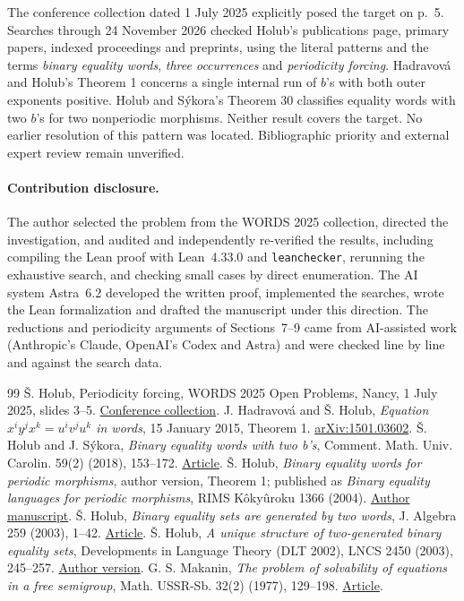 \documentclass[11pt]{article}
\theoremstyle{remark}\newtheorem*{remark}{Remark}
\begin{document}
The conference collection dated 1 July 2025 explicitly posed the target on p.~5. Searches through 24 November 2026 checked Holub's publications page, primary papers, indexed proceedings and preprints, using the literal patterns and the terms \emph{binary equality words}, \emph{three occurrences} and \emph{periodicity forcing}. Hadravov\'a and Holub's Theorem 1 concerns a single internal run of \(b\)'s with both outer exponents positive. Holub and S\'ykora's Theorem 30 classifies equality words with two \(b\)'s for two nonperiodic morphisms. Neither result covers the target. No earlier resolution of this pattern was located. Bibliographic priority and external expert review remain unverified.

\paragraph{Contribution disclosure.}
The author selected the problem from the WORDS 2025 collection, directed the investigation, and audited and independently re-verified the results, including compiling the Lean proof with Lean~4.33.0 and \texttt{leanchecker}, rerunning the exhaustive search, and checking small cases by direct enumeration. The AI system Astra~6.2 developed the written proof, implemented the searches, wrote the Lean formalization and drafted the manuscript under this direction. The reductions and periodicity arguments of Sections~7--9 came from AI-assisted work (Anthropic's Claude, OpenAI's Codex and Astra) and were checked line by line and against the search data.

\begin{thebibliography}{99}
\v S. Holub, Periodicity forcing, WORDS 2025 Open Problems, Nancy, 1 July 2025, slides 3--5. \href{https://words2025.loria.fr/files/2025/07/webpage-open-problems.pdf}{Conference collection}.
J. Hadravov\'a and \v S. Holub, \emph{Equation \(x^iy^jx^k=u^iv^ju^k\) in words}, 15 January 2015, Theorem 1. \href{https://arxiv.org/abs/1501.03602}{arXiv:1501.03602}.
\v S. Holub and J. S\'ykora, \emph{Binary equality words with two b's}, Comment. Math. Univ. Carolin. 59(2) (2018), 153--172. \href{https://cmuc.karlin.mff.cuni.cz/pdf/cmuc1802/holsyk.pdf}{Article}.
\v S. Holub, \emph{Binary equality words for periodic morphisms}, author version, Theorem 1; published as \emph{Binary equality languages for periodic morphisms}, RIMS K\^oky\^uroku 1366 (2004). \href{https://www.karlin.mff.cuni.cz/~holub/soubory/rimsrevised.pdf}{Author manuscript}.
\v S. Holub, \emph{Binary equality sets are generated by two words}, J. Algebra 259 (2003), 1--42. \href{https://doi.org/10.1016/S0021-8693(02)00534-3}{Article}.
\v S. Holub, \emph{A unique structure of two-generated binary equality sets}, Developments in Language Theory (DLT 2002), LNCS 2450 (2003), 245--257. \href{https://www.karlin.mff.cuni.cz/~holub/soubory/uniq.pdf}{Author version}.
G. S. Makanin, \emph{The problem of solvability of equations in a free semigroup}, Math. USSR-Sb. 32(2) (1977), 129--198. \href{https://doi.org/10.1070/SM1977v032n02ABEH002376}{Article}.
\end{thebibliography}
\end{document}
